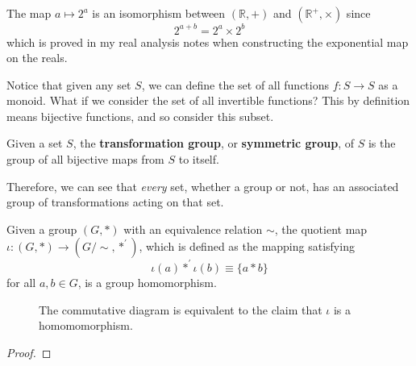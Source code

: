   \begin{example}
    The map $a \mapsto 2^{a}$ is an isomorphism between $(\mathbb{R}, +)$ and $(\mathbb{R}^{+}, \times)$ since 
    \begin{equation}
      2^{a+b} = 2^a \times 2^b
    \end{equation} 
    which is proved in my real analysis notes when constructing the exponential map on the reals. 
  \end{example} 

  Notice that given any set $S$, we can define the set of all functions $f: S \rightarrow S$ as a monoid. What if we consider the set of all invertible functions? This by definition means bijective functions, and so consider this subset.  

  \begin{definition}
    Given a set $S$, the \textbf{transformation group}, or \textbf{symmetric group}, of $S$ is the group of all bijective maps from $S$ to itself. 
  \end{definition}

  Therefore, we can see that \textit{every} set, whether a group or not, has an associated group of transformations acting on that set. 

  \begin{theorem}
    Given a group $(G, \ast)$ with an equivalence relation $\sim$, the quotient map $\iota: (G, \ast) \rightarrow (G/\sim, \ast^\prime)$, which is defined as the mapping satisfying 
    \begin{equation}
      \iota(a) *^\prime \iota(b) \equiv \{ a \ast b \} 
    \end{equation}
    for all $a, b \in G$, is a group homomorphism. 

    \begin{figure}[H]
      \centering 
      \caption{The commutative diagram is equivalent to the claim that $\iota$ is a homomomorphism.} 
      \label{fig:quotient_homomorphism}
    \end{figure}
  \end{theorem}
  \begin{proof}
    
  \end{proof}

